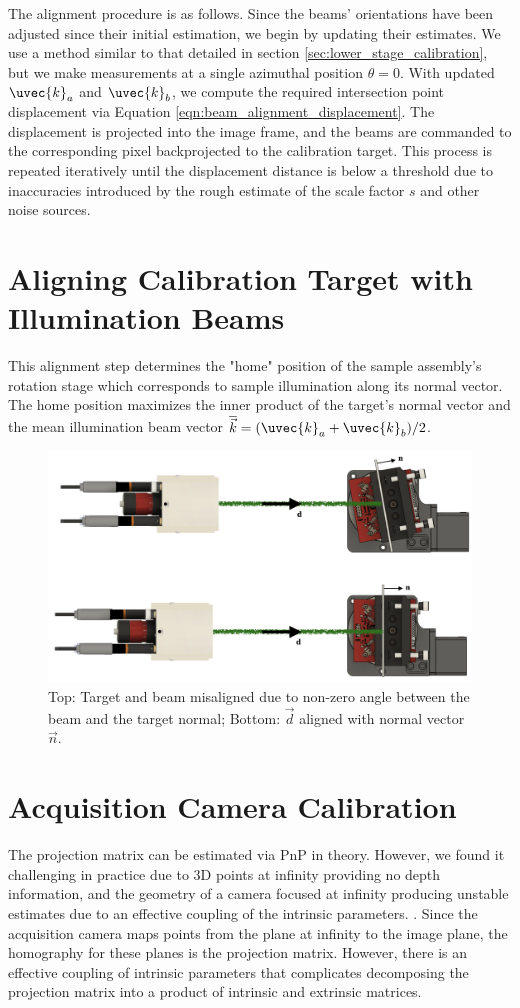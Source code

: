 The alignment procedure is as follows. Since the beams' orientations have been adjusted since their initial estimation, we begin by updating their estimates. We use a method similar to that detailed in section \ref{sec:lower_stage_calibration}, but we make measurements at a single azimuthal position $\theta = 0$. With updated $\uvec{k}_a$ and $\uvec{k}_b$, we compute the required intersection point displacement via Equation \ref{eqn:beam_alignment_displacement}. The displacement is projected into the image frame, and the beams are commanded to the corresponding pixel backprojected to the calibration target. This process is repeated iteratively until the displacement distance is below a threshold due to inaccuracies introduced by the rough estimate of the scale factor $s$ and other noise sources.

\section{Aligning Calibration Target with Illumination Beams}
This alignment step determines the "home" position of the sample assembly's rotation stage which corresponds to sample illumination along its normal vector. The home position maximizes the inner product of the target's normal vector and the mean illumination beam vector $\overline{\vec{k}} = (\uvec{k}_a + \uvec{k}_b)/2$.
\begin{figure}
    \centering
    \includegraphics[width=0.5\linewidth]{figures/target_alignment.png}
    \caption{Top: Target and beam misaligned due to non-zero angle between the beam and the target normal; Bottom: $\vec{d}$ aligned with normal vector $\vec{n}$. }
    \label{fig:sample_beam_alignment}
\end{figure}

\section{Acquisition Camera Calibration}
The projection matrix can be estimated via PnP in theory. However, we found it challenging in practice due to 3D points at infinity providing no depth information, and the geometry of a camera focused at infinity producing unstable estimates due to an effective coupling of the intrinsic parameters. . Since the acquisition camera maps points from the plane at infinity to the image plane, the homography for these planes is the projection matrix. However, there is an effective coupling of intrinsic parameters that complicates decomposing the projection matrix into a product of intrinsic and extrinsic matrices. 

